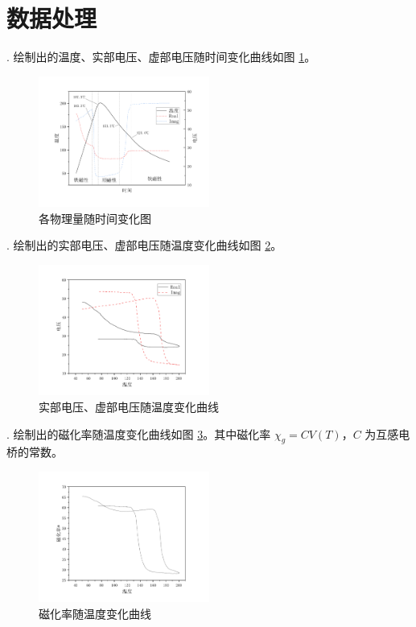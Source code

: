 \section{数据处理}
\Fign. 绘制出的温度、实部电压、虚部电压随时间变化曲线如图 \ref{fig:A8.2a}。\par
\begin{figure}[!ht]
    \caption{各物理量随时间变化图}\label{fig:A8.2a}
    \includegraphics[width=0.5\textwidth]{img/A8/fig2a.pdf}
\end{figure}
\Fign. 绘制出的实部电压、虚部电压随温度变化曲线如图 \ref{fig:A8.2b}。\par
\begin{figure}[!ht]
    \caption{实部电压、虚部电压随温度变化曲线}\label{fig:A8.2b}
    \includegraphics[width=0.5\textwidth]{img/A8/fig2c.pdf}
\end{figure}\newpage
\Fign. 绘制出的磁化率随温度变化曲线如图 \ref{fig:A8.2c}。其中磁化率 $\chi_g=C V(T)$，$C$ 为互感电桥的常数。
\begin{figure}[!ht]
    \caption{磁化率随温度变化曲线}\label{fig:A8.2c}
    \includegraphics[width=0.5\textwidth]{img/A8/fig2b.pdf}
\end{figure}

